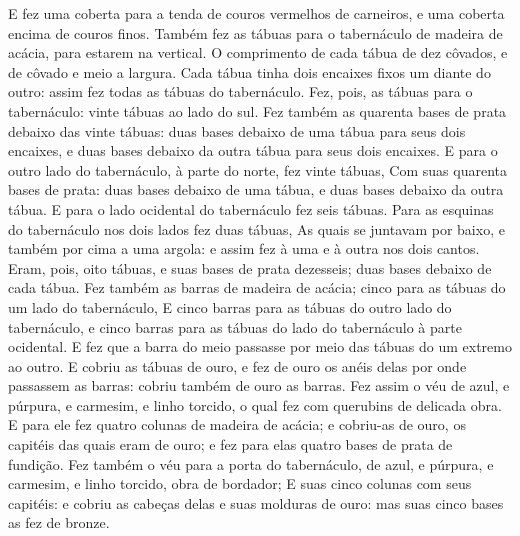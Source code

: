 {  E fez uma coberta para a tenda de couros vermelhos de carneiros, e uma coberta encima de couros finos.
  Também fez as tábuas para o tabernáculo de madeira de acácia, para estarem na vertical.
  O comprimento de cada tábua de dez côvados, e de côvado e meio a largura.
  Cada tábua tinha dois encaixes fixos um diante do outro: assim fez todas as tábuas do tabernáculo.
  Fez, pois, as tábuas para o tabernáculo: vinte tábuas ao lado do sul.
  Fez também as quarenta bases de prata debaixo das vinte tábuas: duas bases debaixo de uma tábua para seus dois encaixes, e duas bases debaixo da outra tábua para seus dois encaixes.
  E para o outro lado do tabernáculo, à parte do norte, fez vinte tábuas,
  Com suas quarenta bases de prata: duas bases debaixo de uma tábua, e duas bases debaixo da outra tábua.
  E para o lado ocidental do tabernáculo fez seis tábuas.
  Para as esquinas do tabernáculo nos dois lados fez duas tábuas,
  As quais se juntavam por baixo, e também por cima a uma argola: e assim fez à uma e à outra nos dois cantos.
  Eram, pois, oito tábuas, e suas bases de prata dezesseis; duas bases debaixo de cada tábua.
  Fez também as barras de madeira de acácia; cinco para as tábuas do um lado do tabernáculo,
  E cinco barras para as tábuas do outro lado do tabernáculo, e cinco barras para as tábuas do lado do tabernáculo à parte ocidental.
  E fez que a barra do meio passasse por meio das tábuas do um extremo ao outro.
  E cobriu as tábuas de ouro, e fez de ouro os anéis delas por onde passassem as barras: cobriu também de ouro as barras. %
  Fez assim o véu de azul, e púrpura, e carmesim, e linho torcido, o qual fez com querubins de delicada obra.
  E para ele fez quatro colunas de madeira de acácia; e cobriu-as de ouro, os capitéis das quais eram de ouro; e fez para elas quatro bases de prata de fundição.
  Fez também o véu para a porta do tabernáculo, de azul, e púrpura, e carmesim, e linho torcido, obra de bordador;
  E suas cinco colunas com seus capitéis: e cobriu as cabeças delas e suas molduras de ouro: mas suas cinco bases as fez de bronze.
\par }

